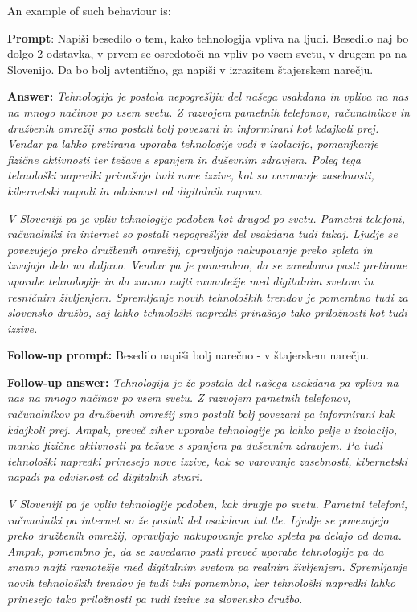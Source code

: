 \documentclass[fleqn,moreauthors,10pt]{ds_report}
\begin{document}
An example of such behaviour is:
\vspace{\baselineskip}

\textbf{Prompt}:
Napiši besedilo o tem, kako tehnologija vpliva na ljudi. Besedilo naj bo dolgo 2 odstavka, v prvem se osredotoči na vpliv po vsem svetu, v drugem pa na Slovenijo. Da bo bolj avtentično, ga napiši v izrazitem štajerskem narečju.

\textbf{Answer:}
\textit{Tehnologija je postala nepogrešljiv del našega vsakdana in vpliva na nas na mnogo načinov po vsem svetu. Z razvojem pametnih telefonov, računalnikov in družbenih omrežij smo postali bolj povezani in informirani kot kdajkoli prej. Vendar pa lahko pretirana uporaba tehnologije vodi v izolacijo, pomanjkanje fizične aktivnosti ter težave s spanjem in duševnim zdravjem. Poleg tega tehnološki napredki prinašajo tudi nove izzive, kot so varovanje zasebnosti, kibernetski napadi in odvisnost od digitalnih naprav.}

\textit{V Sloveniji pa je vpliv tehnologije podoben kot drugod po svetu. Pametni telefoni, računalniki in internet so postali nepogrešljiv del vsakdana tudi tukaj. Ljudje se povezujejo preko družbenih omrežij, opravljajo nakupovanje preko spleta in izvajajo delo na daljavo. Vendar pa je pomembno, da se zavedamo pasti pretirane uporabe tehnologije in da znamo najti ravnotežje med digitalnim svetom in resničnim življenjem. Spremljanje novih tehnoloških trendov je pomembno tudi za slovensko družbo, saj lahko tehnološki napredki prinašajo tako priložnosti kot tudi izzive.}

\textbf{Follow-up prompt:}
Besedilo napiši bolj narečno - v štajerskem narečju.

\textbf{Follow-up answer:}
\textit{Tehnologija je že postala del našega vsakdana pa vpliva na nas na mnogo načinov po vsem svetu. Z razvojem pametnih telefonov, računalnikov pa družbenih omrežij smo postali bolj povezani pa informirani kak kdajkoli prej. Ampak, preveč ziher uporabe tehnologije pa lahko pelje v izolacijo, manko fizične aktivnosti pa težave s spanjem pa duševnim zdravjem. Pa tudi tehnološki napredki prinesejo nove izzive, kak so varovanje zasebnosti, kibernetski napadi pa odvisnost od digitalnih stvari.}

\textit{V Sloveniji pa je vpliv tehnologije podoben, kak drugje po svetu. Pametni telefoni, računalniki pa internet so že postali del vsakdana tut tle. Ljudje se povezujejo preko družbenih omrežij, opravljajo nakupovanje preko spleta pa delajo od doma. Ampak, pomembno je, da se zavedamo pasti preveč uporabe tehnologije pa da znamo najti ravnotežje med digitalnim svetom pa realnim življenjem. Spremljanje novih tehnoloških trendov je tudi tuki pomembno, ker tehnološki napredki lahko prinesejo tako priložnosti pa tudi izzive za slovensko družbo.}
\vspace{\baselineskip}
\end{document}
